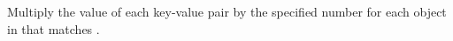Multiply the value of each key-value pair by the specified number for each
object in  that matches .



